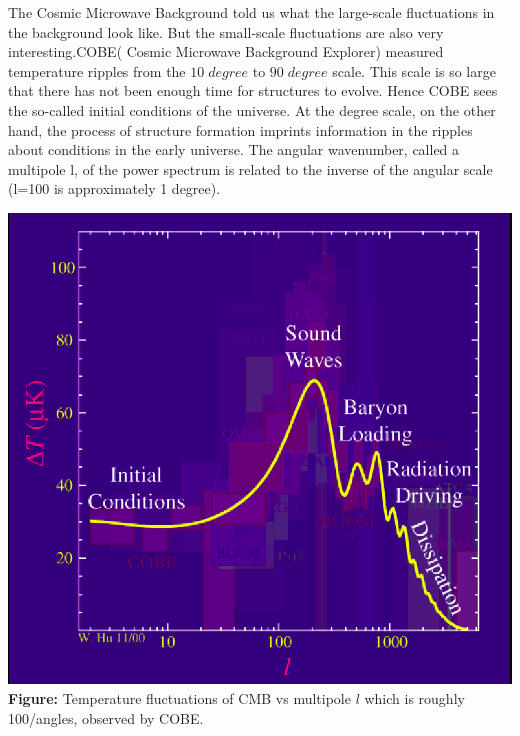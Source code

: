 \documentclass[12pt]{report}
\begin{document}
The Cosmic Microwave Background told us what the large-scale fluctuations in the background look like. But the small-scale fluctuations are also very interesting.COBE( Cosmic Microwave Background Explorer) measured temperature ripples from the $10\; degree$ to $90\; degree$ scale. This scale is so large that there has not been enough time for structures to evolve.  Hence COBE sees the so-called initial conditions of the universe. At the degree scale, on the other hand, the process of structure formation imprints information in the ripples about conditions in the early universe. The angular wavenumber, called a multipole l, of the power spectrum is related to the inverse of the angular scale (l=100 is approximately 1 degree).\\

\begin{center}
\includegraphics[scale=0.35]{deltvsl.png}\\
\textbf{Figure:} Temperature fluctuations of CMB vs multipole $l$ which is roughly 100/angles, observed by COBE.\cite{whu}
\end{center}
\end{document}
